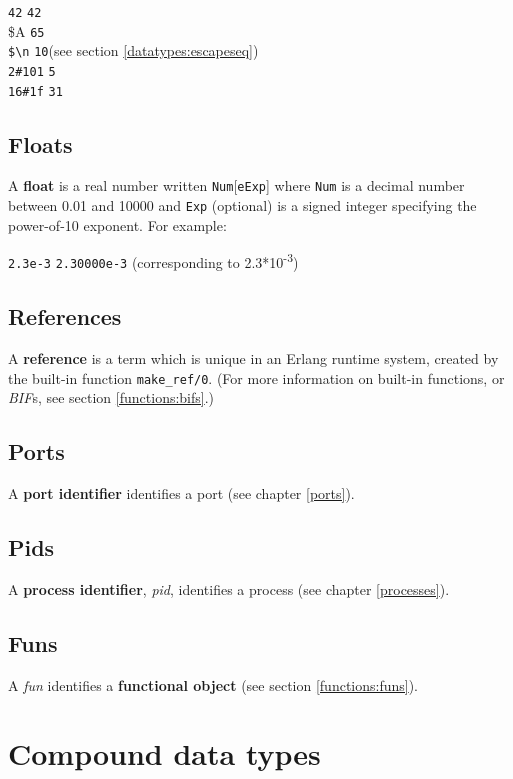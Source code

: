 \texttt{42} \resultingin \texttt{42} \\
\$A  \resultingin \texttt{65} \\
\texttt{\$\textbackslash n} \resultingin \texttt{10}\hfill(see section \ref{datatypes:escapeseq}) \\
\texttt{2\#101} \resultingin \texttt{5} \\
\texttt{16\#1f} \resultingin \texttt{31}


\subsection{Floats}
\label{datatypes:float}
A \textbf{float} is a real number written \texttt{Num}[\texttt{eExp}]
where \texttt{Num} is a decimal number between 0.01 and 10000 and
\texttt{Exp} (optional) is a signed integer specifying the power-of-10 exponent.  For example:

\texttt{2.3e-3} \resultingin \texttt{2.30000e-3}\hfill
(corresponding to 2.3*10\textsuperscript{-3})


\subsection{References}
\label{datatypes:reference}
A \textbf{reference} is a term which is unique in an Erlang runtime
system, created by the built-in function \texttt{make\_ref/0}.  (For more information on built-in functions, or \textit{BIF}s, see section \ref{functions:bifs}.)


\subsection{Ports}
\label{datatypes:port}
A \textbf{port identifier} identifies a port (see chapter \ref{ports}).


\subsection{Pids}
\label{datatypes:pid}
A \textbf{process identifier}, \textit{pid}, identifies a process (see
chapter \ref{processes}).


\subsection{Funs}
\label{datatypes:fun}
A \textit{fun} identifies a \textbf{functional object} (see section
\ref{functions:funs}).


\section{Compound data types}

